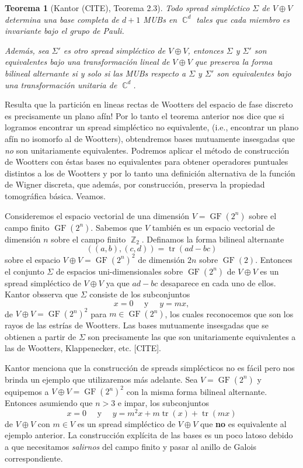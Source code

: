 \documentclass[a4paper]{report}
\DeclareMathOperator{\C}{\mathbb{C}}
\DeclareMathOperator{\Z}{\mathbb{Z}}
\DeclareMathOperator{\tr}{tr}
\DeclareMathOperator{\GF}{GF}
\newtheorem{theorem}{Teorema}
\begin{document}
  \begin{theorem}[Kantor (CITE), Teorema 2.3]
    Todo spread simpléctico $\Sigma$ de $V \oplus V$ 
    determina una base completa de $d+1$ MUBs en $\C^{d}$ 
    tales que cada miembro es invariante bajo el grupo de
    Pauli.

    Además, sea $\Sigma'$ es otro spread simpléctico de $V
    \oplus V$, entonces $\Sigma$ y $\Sigma'$ son
    equivalentes bajo una transformación lineal de $V \oplus
    V$ que preserva la forma bilineal alternante si y solo
    si las MUBs respecto a  $\Sigma$ y $\Sigma'$ son
    equivalentes bajo una transformación unitaria de
    $\C^{d}$.
  \end{theorem}

  Resulta que la partición en lineas rectas de Wootters del
  espacio de fase discreto es precisamente un plano afín!
  Por lo tanto el teorema anterior nos dice que si logramos
  encontrar un spread simpléctico no equivalente, (i.e.,
  encontrar un plano afín no isomorfo al de Wootters),
  obtendremos bases mutuamente insesgadas que \textit{no}
  son unitariamente equivalentes. Podremos aplicar el método
  de construcción de Wootters con éstas bases no
  equivalentes para obtener operadores puntuales distintos a
  los de Wootters y por lo tanto una definición
  alternativa de la función de Wigner discreta, que además,
  por construcción, preserva la propiedad tomográfica
  básica. Veamos.

  Consideremos el espacio vectorial de una dimensión $V =
  \GF(2^{n})$ sobre el campo finito $\GF(2^{n})$. Sabemos
  que $V$ también es un espacio vectorial de dimensión $n$ 
  sobre el campo finito $\Z_2$. Definamos la forma bilineal
  alternante
  \[
    \left( (a,b), (c,d) \right) 
    = \tr(ad-bc)
  \] 
  sobre el espacio $V \oplus V = \GF(2^{n})^2$ de dimensión
  $2n$ sobre $\GF(2)$. Entonces el conjunto $\Sigma$ de
  espacios uni-dimensionales sobre $\GF(2^{n})$ de $V \oplus
  V$ es un spread simpléctico de $V \oplus V$ ya que $ad-bc$
  desaparece en cada uno de ellos. Kantor obsserva que
  $\Sigma$ consiste de los subconjuntos
  \[
    x = 0
    \quad \text{ y } \quad
    y = mx,
  \]
  de $V \oplus V = \GF(2^{n})^2$ para $m \in \GF(2^{n})$,
  los cuales reconocemos que son los rayos de las estrías de
  Wootters. Las bases mutuamente insesgadas que se obtienen
  a partir de $\Sigma$ son precisamente las que son
  unitariamente equivalentes a las de Wootters,
  Klappenecker, etc. [CITE]. 

  Kantor menciona que la construcción de spreads
  simplécticos no es fácil pero nos brinda un ejemplo que
  utilizaremos más adelante. Sea $V = \GF(2^{n})$ y
  equipemos a $V \oplus V = \GF(2^{n})^2$ con la misma forma
  bilineal alternante. Entonces asumiendo que $n > 3$ e
  impar, los subconjuntos 
  \[
    x = 0
    \quad \text{ y } \quad
    y = m^2x + m\tr(x) + \tr(mx)
  \]
  de $V \oplus V$ con $m \in V$ es un spread simpléctico de
  $V \oplus V$ que \textbf{no} es equivalente al ejemplo
  anterior. La construcción explícita de las bases es un
  poco latoso debido a que necesitamos \textit{salirnos} del
  campo finito y pasar al anillo de Galois correspondiente.
\end{document}
